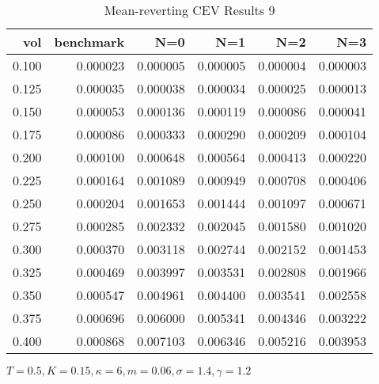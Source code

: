 \begin{table}[ht]
  \centering
  \caption{Mean-reverting CEV Results 9}
  \begin{tabular}{rrrrrr}
  \toprule
    vol &       benchmark &       N=0 &       N=1 &       N=2 &       N=3 \\
  \midrule
  0.100 & 0.000023 & 0.000005 & 0.000005 & 0.000004 & 0.000003 \\
  0.125 & 0.000035 & 0.000038 & 0.000034 & 0.000025 & 0.000013 \\
  0.150 & 0.000053 & 0.000136 & 0.000119 & 0.000086 & 0.000041 \\
  0.175 & 0.000086 & 0.000333 & 0.000290 & 0.000209 & 0.000104 \\
  0.200 & 0.000100 & 0.000648 & 0.000564 & 0.000413 & 0.000220 \\
  0.225 & 0.000164 & 0.001089 & 0.000949 & 0.000708 & 0.000406 \\
  0.250 & 0.000204 & 0.001653 & 0.001444 & 0.001097 & 0.000671 \\
  0.275 & 0.000285 & 0.002332 & 0.002045 & 0.001580 & 0.001020 \\
  0.300 & 0.000370 & 0.003118 & 0.002744 & 0.002152 & 0.001453 \\
  0.325 & 0.000469 & 0.003997 & 0.003531 & 0.002808 & 0.001966 \\
  0.350 & 0.000547 & 0.004961 & 0.004400 & 0.003541 & 0.002558 \\
  0.375 & 0.000696 & 0.006000 & 0.005341 & 0.004346 & 0.003222 \\
  0.400 & 0.000868 & 0.007103 & 0.006346 & 0.005216 & 0.003953 \\
  \bottomrule
  \end{tabular}
  \small{$T=0.5,K=0.15, \kappa = 6,m=0.06, \sigma = 1.4, \gamma = 1.2$}
\end{table}

